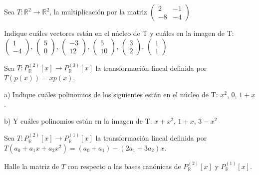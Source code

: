 \begin{exercise}
\item

Sea $T:\mathbb{R}^2 \rightarrow \mathbb{R}^2$, la multiplicación
por la matriz $\left(\begin{array}{cc}2 & -1  \\-8 & -4
\end{array}
 \right)$


 \bigskip

\noindent
Indique cuáles  vectores están en el núcleo de T y cuáles en la
 imagen de T:\\
 
$\left(\begin{array}{c}1\\-4
\end{array}
 \right)$, $\left(\begin{array}{c}5\\0
\end{array}
 \right)$, $\left(\begin{array}{c}-3\\12
\end{array}
 \right)$, $\left(\begin{array}{c}5\\10
\end{array}
 \right)$, $\left(\begin{array}{c}3\\2
\end{array}
 \right)$, $\left(\begin{array}{c}1\\1
\end{array}
 \right)$
\end{exercise}

\bigskip

\begin{exercise}
\item

 Sea $T: P^{(2)}_{\mathbb{R}}[x] \rightarrow P^{(3)}_{\mathbb{R}}[x]$  la transformación lineal definida por
 $T(p(x))=xp(x)$.
 
\bigskip

a)
 Indique cuáles  polinomios de los siguientes están en el núcleo de
 T:  $x^2$, $0$, $1+x$.


b) Y cuáles polinomios están  en la
 imagen de T: $x+x^2$, $1+x$, $3-x^2$
\end{exercise}


\begin{exercise}
 \item

 Sea $T: P^{(2)}_{\mathbb{R}}[x] \rightarrow P^{(1)}_{\mathbb{R}}[x]$ la transformación lineal definida
 por  $T(a_0+a_1x+a_2x^2)=(a_0+a_1)-(2a_1+3a_2)x$.
 
 \noindent
 Halle la matriz de $T$ con respecto a las bases canónicas de
 $P^{(2)}_{\mathbb{R}}[x]$ y $P^{(1)}_{\mathbb{R}}[x]$.

\end{exercise}


